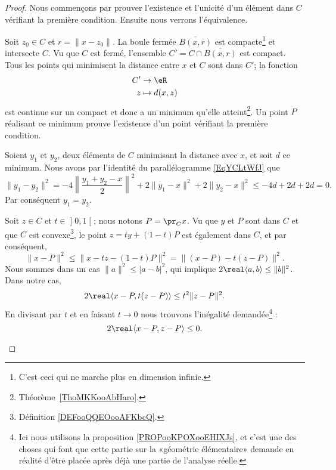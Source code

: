 \begin{proof}
	Nous commençons par prouver l'existence et l'unicité d'un élément dans \( C\) vérifiant la première condition. Ensuite nous verrons l'équivalence.

	\begin{subproof}
		\spitem[Existence]

		Soit \( z_0\in C\) et \( r=\| x-z_0 \|\). La boule fermée \( \overline{ B(x,r) }\) est compacte\footnote{C'est ceci qui ne marche plus en dimension infinie.} et intersecte \( C\). Vu que \( C\) est fermé, l'ensemble \( C'=C\cap\overline{ B(x,r) }\) est compact. Tous les points qui minimisent la distance entre \( x\) et \( C\) sont dans \( C'\); la fonction
		\begin{equation}
			\begin{aligned}
				C' & \to \eR        \\
				z  & \mapsto d(x,z)
			\end{aligned}
		\end{equation}
		est continue sur un compact et donc a un minimum qu'elle atteint\footnote{Théorème~\ref{ThoMKKooAbHaro}.}. Un point \( P\) réalisant ce minimum prouve l'existence d'un point vérifiant la première condition.

		\spitem[Unicité]
		Soient \( y_1\) et \( y_2\), deux éléments de \( C\) minimisant la distance avec \( x\), et soit \( d\) ce minimum. Nous avons par l'identité du parallélogramme \eqref{EqYCLtWfJ} que
		\begin{equation}
			\| y_1-y_2 \|^2=-4\left\| \frac{ y_1+y_2-x }{2} \right\|^2+2\| y_1-x \|^2+2\| y_2-x \|^2\leq -4d+2d+2d=0.
		\end{equation}
		Par conséquent \( y_1=y_2\).

		\spitem[\ref{zzETsfYCSItemi}\( \Rightarrow\)~\ref{zzETsfYCSItemii}]
        Soit \( z\in C\) et \( t\in \mathopen] 0 , 1 \mathclose[\); nous notons \( P=\pr_Cx\). Vu que \( y\) et \( P\) sont dans \( C\) et que \( C\) est convexe\footnote{Définition \ref{DEFooQQEOooAFKbcQ}.}, le point \( z=ty+(1-t)P\) est également dans \( C\), et par conséquent,
		\begin{equation}
			\| x-P \|^2\leq\| x-tz-(1-t)P \|^2=\| (x-P)-t(z-P) \|^2.
		\end{equation}
		Nous sommes dans un cas \( \| a \|^2\leq | a-b |^2\), qui implique \( 2\real\langle a, b\rangle \leq \| b \|^2\). Dans notre cas,
		\begin{equation}
			2\real\langle x-P , t(z-P)\rangle \leq t^2\| z-P \|^2.
		\end{equation}
		En divisant par \( t\) et en faisant \( t\to 0\) nous trouvons l'inégalité demandée\footnote{Ici nous utilisons la proposition \ref{PROPooKPOXooEHIXJs}, et c'est une des choses qui font que cette partie sur la «géométrie élémentaire» demande en réalité d'être placée après déjà une partie de l'analyse réelle.} :
		\begin{equation}
			2\real\langle x-P, z-P\rangle \leq 0.
		\end{equation}


\end{subproof}
\end{proof}
